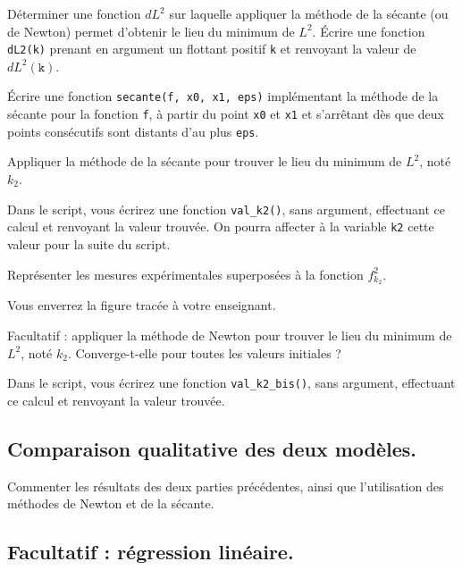 \question{} Déterminer une fonction $dL^2$ sur laquelle appliquer la méthode de la sécante (ou de Newton) permet d'obtenir le lieu du minimum de $L^2$.
Écrire une fonction \texttt{dL2(k)} prenant en argument un flottant positif \texttt{k} et renvoyant la valeur de $dL^2(\texttt k)$.

\medskip{}

\question{}\'Ecrire une fonction \texttt{secante(f, x0, x1, eps)} implémentant la méthode de la sécante pour la fonction \texttt{f}, à partir du point \texttt{x0} et \texttt{x1} et s'arrêtant dès que deux points consécutifs sont distants d'au plus \texttt{eps}.

\medskip{}  

 
\question{} Appliquer la méthode de la sécante pour trouver le lieu du minimum de $L^2$, noté $k_2$. 

Dans le script, vous écrirez une fonction \texttt{val\_k2()}, sans argument, effectuant ce calcul et renvoyant la valeur trouvée. On pourra affecter à la variable \texttt{k2} cette valeur pour la suite du script.

\medskip{}

\question{\label{qu:tracef2}} Représenter les mesures expérimentales superposées à la fonction $f^2_{k_2}$.

  Vous enverrez la figure tracée à votre enseignant. 


\medskip{}  
 
\question{} Facultatif : appliquer la méthode de Newton pour trouver le lieu du minimum de $L^2$, noté $k_2$. Converge-t-elle pour toutes les valeurs initiales ?

Dans le script, vous écrirez une fonction \texttt{val\_k2\_bis()}, sans argument, effectuant ce calcul et renvoyant la valeur trouvée. 


\subsection*{Comparaison qualitative des deux modèles.}


\question{} Commenter les résultats des deux parties précédentes, ainsi que l'utilisation des méthodes de Newton et de la sécante.


\subsection*{Facultatif : régression linéaire.}
\label{sec.papl.reglin}

